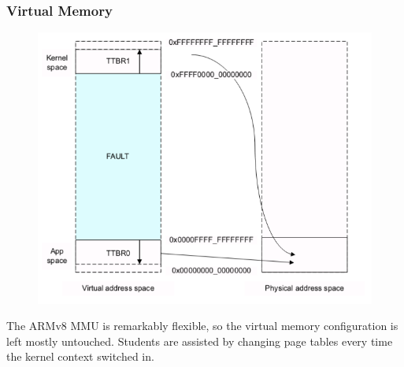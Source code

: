 \documentclass[table,xcdraw]{beamer}
\begin{document}
\begin{frame}[fragile]
    \frametitle{Virtual Memory}
    \vspace{-2cm}
    \begin{figure}
        \includegraphics[scale=0.35]{ttbr.png}
    \end{figure}
    The ARMv8 MMU is remarkably flexible, so the virtual memory configuration is left
    mostly untouched.
    Students are assisted by changing page tables every time the kernel context
    switched in.

\end{frame}
\end{document}
